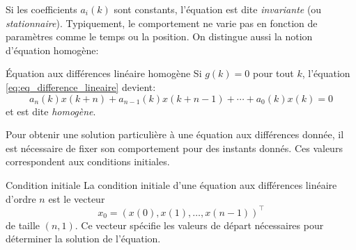             Si les coefficients $a_i(k)$ sont constants, l'équation est dite \textit{invariante} (ou \textit{stationnaire}). Typiquement, le comportement ne varie pas en fonction de paramètres comme le temps ou la position. On distingue aussi la notion d'équation homogène:
            \begin{definition}{Équation aux différences linéaire homogène}
               Si $g(k) = 0$ pour tout $k$, l'équation \ref{eq:eq_difference_lineaire} devient:
                \begin{equation}
                    a_n(k)x(k+n)+a_{n-1}(k)x(k+n-1)+\cdots+a_0(k)x(k) = 0
                \end{equation}
                et est dite \textit{homogène}.
            \end{definition}

            Pour obtenir une solution particulière à une équation aux différences donnée, il est nécessaire de fixer son comportement pour des instants donnés. Ces valeurs correspondent aux conditions initiales.
            \begin{definition}{Condition initiale}
                La condition initiale d'une équation aux différences linéaire d’ordre $n$ est le vecteur 
                \begin{equation}
                    x_0 = (x(0), x(1), \dots, x(n-1))^\top
                \end{equation}
                de taille $(n,1)$. Ce vecteur spécifie les valeurs de départ nécessaires pour déterminer la solution de l'équation.
            \end{definition}

